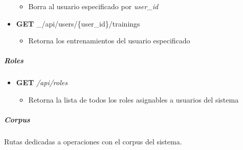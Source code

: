 \documentclass[12pt,a4paper,]{scrartcl}
\providecommand{\tightlist}{%
  \setlength{\itemsep}{0pt}\setlength{\parskip}{0pt}}
\let\oldsubparagraph\subparagraph
\renewcommand{\subparagraph}[1]{\oldsubparagraph{#1}\mbox{}}
\begin{document}
\begin{itemize}
  \begin{itemize}
  \tightlist
  \item
    Borra al usuario especificado por \emph{user\_id}
  \end{itemize}
\item
  \textbf{GET} \_/api/users/\{user\_id\}/trainings

  \begin{itemize}
  \tightlist
  \item
    Retorna los entrenamientos del usuario especificado
  \end{itemize}
\end{itemize}

\hypertarget{roles}{%
\subparagraph{Roles}\label{roles}}

\begin{itemize}
\tightlist
\item
  \textbf{GET} \emph{/api/roles}

  \begin{itemize}
  \tightlist
  \item
    Retorna la lista de todos los roles asignables a usuarios del sistema
  \end{itemize}
\end{itemize}

\hypertarget{corpus-2}{%
\subparagraph{Corpus}\label{corpus-2}}

Rutas dedicadas a operaciones con el corpus del sistema.
\end{document}
